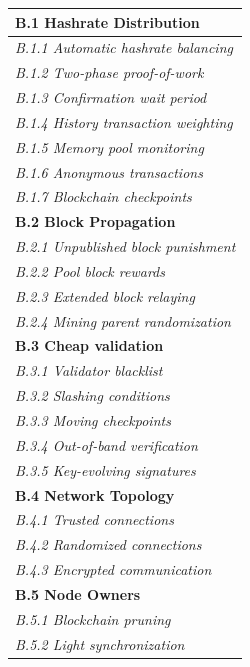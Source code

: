 \documentclass[12pt,a4paper]{article}
\begin{document}
\begin{tabular}{| l |}
  \hline

  \textbf{B.1 Hashrate Distribution}\\
  \hline
  \textit{B.1.1 Automatic hashrate balancing}\\
  \hline
  \textit{B.1.2 Two-phase proof-of-work}\\
  \hline
  \textit{B.1.3 Confirmation wait period}\\
  \hline
  \textit{B.1.4 History transaction weighting}\\
  \hline
  \textit{B.1.5 Memory pool monitoring}\\
  \hline
  \textit{B.1.6 Anonymous transactions}\\
  \hline
  \textit{B.1.7 Blockchain checkpoints}\\
  \hline

  \textbf{B.2 Block Propagation}\\
  \hline
  \textit{B.2.1 Unpublished block punishment}\\
  \hline
  \textit{B.2.2 Pool block rewards}\\
  \hline
  \textit{B.2.3 Extended block relaying}\\
  \hline
  \textit{B.2.4 Mining parent randomization}\\
  \hline

  \textbf{B.3 Cheap validation}\\
  \hline
  \textit{B.3.1 Validator blacklist}\\
  \hline
  \textit{B.3.2 Slashing conditions}\\
  \hline
  \textit{B.3.3 Moving checkpoints}\\
  \hline
  \textit{B.3.4 Out-of-band verification}\\
  \hline
  \textit{B.3.5 Key-evolving signatures}\\
  \hline

  \textbf{B.4 Network Topology}\\
  \hline
  \textit{B.4.1 Trusted connections}\\
  \hline
  \textit{B.4.2 Randomized connections}\\
  \hline
  \textit{B.4.3 Encrypted communication}\\
  \hline

  \textbf{B.5 Node Owners}\\
  \hline
  \textit{B.5.1 Blockchain pruning}\\
  \hline
  \textit{B.5.2 Light synchronization}\\
  \hline


\end{tabular}
\end{document}
